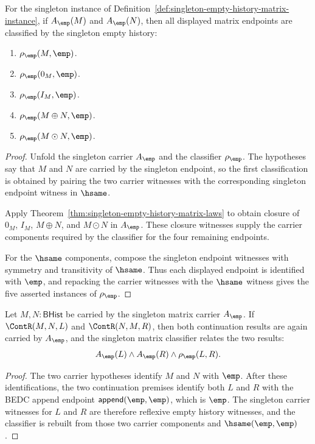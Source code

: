 \begin{theorem}
\label{thm:singleton-empty-history-matrix-endpoint-exactness}
For the singleton instance of
Definition~\ref{def:singleton-empty-history-matrix-instance}, if
$A_{\emp}(M)$ and $A_{\emp}(N)$, then all displayed matrix endpoints are
classified by the singleton empty history:
\begin{enumerate}
  \item $\rho_{\emp}(M,\emp)$.
  \item $\rho_{\emp}(0_M,\emp)$.
  \item $\rho_{\emp}(I_M,\emp)$.
  \item $\rho_{\emp}(M\oplus N,\emp)$.
  \item $\rho_{\emp}(M\odot N,\emp)$.
\end{enumerate}
\end{theorem}
\begin{proof}
Unfold the singleton carrier $A_{\emp}$ and the classifier
$\rho_{\emp}$. The hypotheses say that $M$ and $N$ are carried by the
singleton endpoint, so the first classification is obtained by pairing the
two carrier witnesses with the corresponding singleton endpoint witness in
$\hsame$.

Apply Theorem~\ref{thm:singleton-empty-history-matrix-laws} to obtain closure
of $0_M$, $I_M$, $M\oplus N$, and $M\odot N$ in $A_{\emp}$. These closure
witnesses supply the carrier components required by the classifier for the
four remaining endpoints.

For the $\hsame$ components, compose the singleton endpoint witnesses with
symmetry and transitivity of $\hsame$. Thus each displayed endpoint is
identified with $\emp$, and repacking the carrier witnesses with the
$\hsame$ witness gives the five asserted instances of $\rho_{\emp}$.
\end{proof}


\begin{theorem}
\label{thm:matrix-singleton-classifier-continuation-comm-closed}
Let $M,N:\mathsf{BHist}$ be carried by the singleton matrix carrier
$A_{\emp}$. If $\ContR(M,N,L)$ and $\ContR(N,M,R)$, then both continuation
results are again carried by $A_{\emp}$, and the singleton matrix classifier
relates the two results:
$$
A_{\emp}(L)\land A_{\emp}(R)\land \rho_{\emp}(L,R).
$$
\end{theorem}
\begin{proof}
The two carrier hypotheses identify $M$ and $N$ with $\emp$. After these
identifications, the two continuation premises identify both $L$ and $R$ with
the BEDC append endpoint $\mathsf{append}(\emp,\emp)$, which is $\emp$. The
singleton carrier witnesses for $L$ and $R$ are therefore reflexive empty
history witnesses, and the classifier is rebuilt from those two carrier
components and $\hsame(\emp,\emp)$.
\end{proof}

